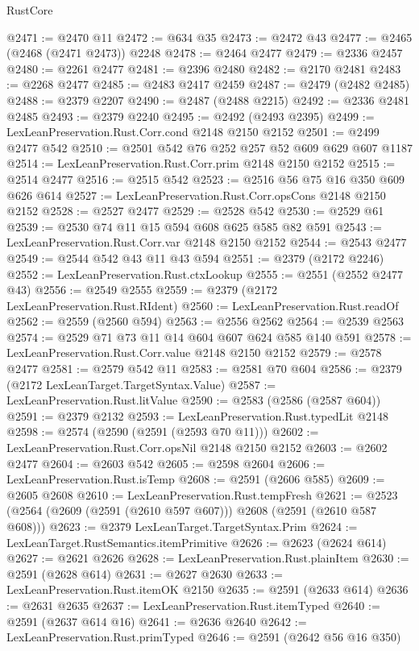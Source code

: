 \begin{lexlean}{RustCore}
\begin{coremodule}
@2471 := @2470 @11
@2472 := @634 @35
@2473 := @2472 @43
@2477 := @2465 (@2468 (@2471 @2473)) @2248
@2478 := @2464 @2477
@2479 := @2336 @2457
@2480 := @2261 @2477
@2481 := @2396 @2480
@2482 := @2170 @2481
@2483 := @2268 @2477
@2485 := @2483 @2417 @2459
@2487 := @2479 (@2482 @2485)
@2488 := @2379 @2207
@2490 := @2487 (@2488 @2215)
@2492 := @2336 @2481 @2485
@2493 := @2379 @2240
@2495 := @2492 (@2493 @2395)
@2499 := LexLeanPreservation.Rust.Corr.cond @2148 @2150 @2152
@2501 := @2499 @2477 @542
@2510 := @2501 @542 @76 @252 @257 @52 @609 @629 @607 @1187
@2514 := LexLeanPreservation.Rust.Corr.prim @2148 @2150 @2152
@2515 := @2514 @2477
@2516 := @2515 @542
@2523 := @2516 @56 @75 @16 @350 @609 @626 @614
@2527 := LexLeanPreservation.Rust.Corr.opsCons @2148 @2150 @2152
@2528 := @2527 @2477
@2529 := @2528 @542
@2530 := @2529 @61
@2539 := @2530 @74 @11 @15 @594 @608 @625 @585 @82 @591
@2543 := LexLeanPreservation.Rust.Corr.var @2148 @2150 @2152
@2544 := @2543 @2477
@2549 := @2544 @542 @43 @11 @43 @594
@2551 := @2379 (@2172 @2246)
@2552 := LexLeanPreservation.Rust.ctxLookup
@2555 := @2551 (@2552 @2477 @43)
@2556 := @2549 @2555
@2559 := @2379 (@2172 LexLeanPreservation.Rust.RIdent)
@2560 := LexLeanPreservation.Rust.readOf
@2562 := @2559 (@2560 @594)
@2563 := @2556 @2562
@2564 := @2539 @2563
@2574 := @2529 @71 @73 @11 @14 @604 @607 @624 @585 @140 @591
@2578 := LexLeanPreservation.Rust.Corr.value @2148 @2150 @2152
@2579 := @2578 @2477
@2581 := @2579 @542 @11
@2583 := @2581 @70 @604
@2586 := @2379 (@2172 LexLeanTarget.TargetSyntax.Value)
@2587 := LexLeanPreservation.Rust.litValue
@2590 := @2583 (@2586 (@2587 @604))
@2591 := @2379 @2132
@2593 := LexLeanPreservation.Rust.typedLit @2148
@2598 := @2574 (@2590 (@2591 (@2593 @70 @11)))
@2602 := LexLeanPreservation.Rust.Corr.opsNil @2148 @2150 @2152
@2603 := @2602 @2477
@2604 := @2603 @542
@2605 := @2598 @2604
@2606 := LexLeanPreservation.Rust.isTemp
@2608 := @2591 (@2606 @585)
@2609 := @2605 @2608
@2610 := LexLeanPreservation.Rust.tempFresh
@2621 := @2523 (@2564 (@2609 (@2591 (@2610 @597 @607))) @2608 (@2591 (@2610 @587 @608)))
@2623 := @2379 LexLeanTarget.TargetSyntax.Prim
@2624 := LexLeanTarget.RustSemantics.itemPrimitive
@2626 := @2623 (@2624 @614)
@2627 := @2621 @2626
@2628 := LexLeanPreservation.Rust.plainItem
@2630 := @2591 (@2628 @614)
@2631 := @2627 @2630
@2633 := LexLeanPreservation.Rust.itemOK @2150
@2635 := @2591 (@2633 @614)
@2636 := @2631 @2635
@2637 := LexLeanPreservation.Rust.itemTyped
@2640 := @2591 (@2637 @614 @16)
@2641 := @2636 @2640
@2642 := LexLeanPreservation.Rust.primTyped
@2646 := @2591 (@2642 @56 @16 @350)

\end{coremodule}
\end{lexlean}
